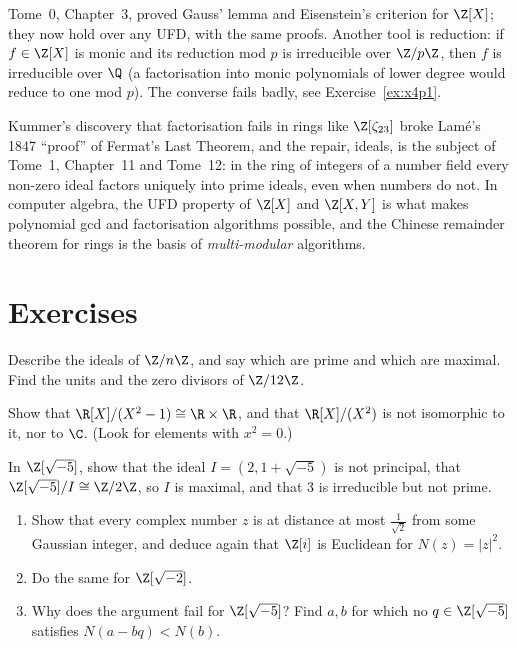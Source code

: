 Tome~0, Chapter~3, proved Gauss' lemma and Eisenstein's criterion for $\Z[X]$; they now hold over any UFD, with the same proofs. Another tool is reduction: if $f\in\Z[X]$ is monic and its reduction mod $p$ is irreducible over $\Z/p\Z$, then $f$ is irreducible over $\Q$ (a factorisation into monic polynomials of lower degree would reduce to one mod $p$). The converse fails badly, see Exercise~\ref{ex:x4p1}.

\begin{beauty}
Kummer's discovery that factorisation fails in rings like $\Z[\zeta_{23}]$ broke Lamé's 1847 ``proof'' of Fermat's Last Theorem, and the repair, ideals, is the subject of Tome~1, Chapter~11 and Tome~12: in the ring of integers of a number field every non-zero ideal factors uniquely into prime ideals, even when numbers do not. In computer algebra, the UFD property of $\Z[X]$ and $\Z[X,Y]$ is what makes polynomial gcd and factorisation algorithms possible, and the Chinese remainder theorem for rings is the basis of \emph{multi-modular} algorithms.
\end{beauty}

\section{Exercises}

\begin{exercise}[$\star$]\label{ex:idealsZn}
Describe the ideals of $\Z/n\Z$, and say which are prime and which are maximal. Find the units and the zero divisors of $\Z/12\Z$.
\end{exercise}

\begin{exercise}[$\star$]\label{ex:quot}
Show that $\R[X]/(X^2-1)\cong\R\times\R$, and that $\R[X]/(X^2)$ is not isomorphic to it, nor to $\C$. (Look for elements with $x^2=0$.)
\end{exercise}

\begin{exercise}[$\star\star$]\label{ex:zsqrtm5}
In $\Z[\sqrt{-5}]$, show that the ideal $I=(2,1+\sqrt{-5})$ is not principal, that $\Z[\sqrt{-5}]/I\cong\Z/2\Z$, so $I$ is maximal, and that $3$ is irreducible but not prime.
\end{exercise}

\begin{exercise}[$\star\star$]\label{ex:zi}
\begin{enumerate}[label=(\alph*)]
\item Show that every complex number $z$ is at distance at most $\frac1{\sqrt2}$ from some Gaussian integer, and deduce again that $\Z[i]$ is Euclidean for $N(z)=|z|^2$.
\item Do the same for $\Z[\sqrt{-2}]$.
\item Why does the argument fail for $\Z[\sqrt{-5}]$? Find $a,b$ for which no $q\in\Z[\sqrt{-5}]$ satisfies $N(a-bq)<N(b)$.
\end{enumerate}
\end{exercise}

